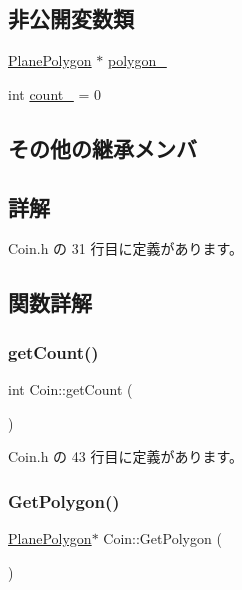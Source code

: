 \subsection*{非公開変数類}
\begin{DoxyCompactItemize}
\item 
\mbox{\hyperlink{class_plane_polygon}{Plane\+Polygon}} $\ast$ \mbox{\hyperlink{class_coin_a30f920359d7dd4fa7b44f5135890c377}{polygon\+\_\+}}
\item 
int \mbox{\hyperlink{class_coin_aae793812faef50ec76f8293676150a9a}{count\+\_\+}} = 0
\end{DoxyCompactItemize}
\subsection*{その他の継承メンバ}


\subsection{詳解}


 Coin.\+h の 31 行目に定義があります。



\subsection{関数詳解}
\mbox{\label{class_coin_a5b302d3ad7be44267e1f4e6a54b0f23c}} 
\subsubsection{\texorpdfstring{get\+Count()}{getCount()}}
{\footnotesize\ttfamily int Coin\+::get\+Count (\begin{DoxyParamCaption}{ }\end{DoxyParamCaption})\hspace{0.3cm}{\ttfamily [inline]}}



 Coin.\+h の 43 行目に定義があります。

\mbox{\label{class_coin_af435ca01cc92d7214e7bc94ed486ab7b}} 
\subsubsection{\texorpdfstring{Get\+Polygon()}{GetPolygon()}}
{\footnotesize\ttfamily \mbox{\hyperlink{class_plane_polygon}{Plane\+Polygon}}$\ast$ Coin\+::\+Get\+Polygon (\begin{DoxyParamCaption}{ }\end{DoxyParamCaption})\hspace{0.3cm}{\ttfamily [inline]}}



